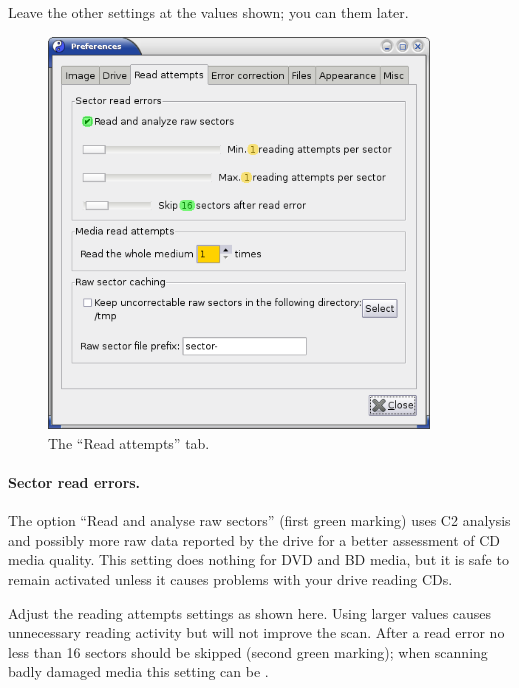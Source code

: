 \smallskip

Leave the other settings at the values shown; you
can  them later.

\newpage

\begin{figure}[h]
\centerline{\includegraphics[width=0.9\textwidth]{screenshots/scan-prefs-read-attempts.png}}
\caption{The ``Read attempts'' tab.}  
\label{howto-scan-prefs-read-attempts}
\end{figure}

\paragraph{Sector read errors.} The option ``Read and analyse raw sectors''
(first green marking) uses C2 analysis and possibly more raw data
reported by the drive for a better assessment of CD media quality.
This setting does nothing for DVD and BD media, but it is safe to
remain activated unless it causes problems with your drive reading CDs.

Adjust the reading attempts settings as shown here. Using larger
values causes unnecessary reading activity but will not improve the scan.
After a read error no less than 16 sectors should be skipped (second
green marking); when scanning badly damaged media this setting can
be .


